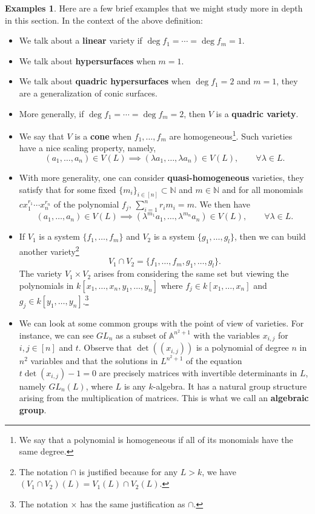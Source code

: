 \documentclass{tufte-handout} %
\theoremstyle{definition}
\newtheorem{exmps}[thm]{Examples}
\theoremstyle{remark}
\newcommand{\N}{\mathbb{N}}
\newcommand{\bA}{\mathbb{A}}
\begin{document}
\begin{exmps}
	Here are a few brief examples that we might study more in depth in this section. In the context of the above definition:
	\begin{itemize}
		\item We talk about a \textbf{linear} variety if $\deg f_1 = \cdots = \deg f_m = 1$.
		\item We talk about \textbf{hypersurfaces} when $m= 1$. 
		\item We talk about \textbf{quadric hypersurfaces} when $\deg f_1 = 2$ and $m=1$, they are a generalization of conic surfaces.
		\item More generally, if $\deg f_1 = \cdots = \deg f_m = 2$, then $V$ is a \textbf{quadric variety}.
		\item We say that $V$ is a \textbf{cone} when $f_1,  \dots, f_m$ are homogeneous\footnote{We say that a polynomial is homogeneous if all of its monomials have the same degree.}. Such varieties have a nice scaling property, namely, \[(a_1, \dots, a_n) \in V(L) \implies (\lambda a_1, \dots, \lambda a_n) \in V(L), \qquad \forall \lambda \in L.\]
		\item With more generality, one can consider \textbf{quasi-homogeneous} varieties, they satisfy that for some fixed $\{m_i\}_{i \in [n]} \subset \N$ and $m \in \N$ and for all monomials $cx_1^{r_1}\cdots x_n^{r_n}$ of the polynomial $f_j$, $\sum_{i=1}^nr_im_i = m$. We then have \[(a_1, \dots, a_n) \in V(L)\implies (\lambda^{m_1} a_1, \dots, \lambda^{m_n} a_n) \in V(L), \qquad \forall \lambda \in L.\]
		\item If $V_1$ is a system $\{f_1, \dots, f_m\}$ and $V_2$ is a system $\{g_1, \dots, g_l\}$, then we can build another variety\footnote{The notation $\cap$ is justified because for any $L>k$, we have $(V_1\cap V_2)(L) = V_1(L) \cap V_2(L)$.} \[V_1 \cap V_2 = \{f_1, \dots, f_m, g_1, \dots, g_l\}.\] The variety $V_1 \times V_2$ arises from considering the same set but viewing the polynomials in $k[x_1, \dots, x_n, y_1, \dots, y_n]$ where $f_j \in k[x_1,\dots, x_n]$ and $g_j \in k[y_1, \dots, y_n]$.\footnote{The notation $\times$ has the same justification as $\cap$.}
		\item We can look at some common groups with the point of view of varieties. For instance, we can see $GL_n$ as a subset of $\bA^{n^2+1}$ with the variables $x_{i,j}$ for $i,j \in [n]$ and $t$. Observe that $\det((x_{i,j}))$ is a polynomial of degree $n$ in $n^2$ variables and that the solutions in $L^{n^2+1}$ of the equation $t\det(x_{i,j}) - 1 = 0$ are precisely matrices with invertible determinants in $L$, namely $GL_n(L)$, where $L$ is any $k$-algebra. It has a natural group structure arising from the multiplication of matrices. This is what we call an \textbf{algebraic group}.
	\end{itemize}
\end{exmps}
\end{document}
